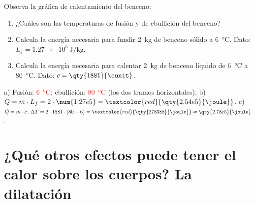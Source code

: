 \begin{exercise}
    Observa la gráfica de calentamiento del benceno:
    \begin{center}
    \end{center}
    \begin{enumerate}[label=\alph*)]
        \item ¿Cuáles son las temperaturas de fusión y de ebullición del benceno?
        \item Calcula la energía necesaria para fundir \qty{2}{\kg} de benceno sólido a \qty{6}{\degreeCelsius}. Dato: \(L_f = \qty{1.27e5}{\joule\per\kg}\).
        \item Calcula la energía necesaria para calentar \qty{2}{\kg} de benceno líquido de \qty{6}{\degreeCelsius} a \qty{80}{\degreeCelsius}. Dato: \(c = \qty{1881}{\cunit}\).
    \end{enumerate}
    \begin{solu}
        a) Fusión: \textcolor{red}{\qty{6}{\degreeCelsius}}; ebullición: \textcolor{red}{\qty{80}{\degreeCelsius}} (los dos tramos horizontales).
        b) \(Q = m \cdot L_f = 2 \cdot \num{1.27e5} = \textcolor{red}{\qty{2.54e5}{\joule}}\).
        c) \(Q = m \cdot c \cdot \Delta T = 2 \cdot 1881 \cdot (80 - 6) = \textcolor{red}{\qty{278388}{\joule}} \approx \qty{2.78e5}{\joule}\).
    \end{solu}
\end{exercise}

\section[La dilatación]{¿Qué otros efectos puede tener el calor sobre los cuerpos? La dilatación}

